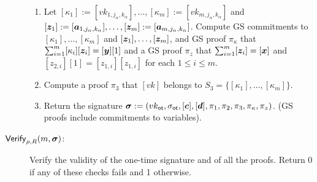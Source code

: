 \begin{description}
\begin{enumerate}
\item Let $[\kappa_1]:=[vk_{1,j_\alpha,k_\alpha}],\ldots,[\kappa_m]:=[vk_{m,j_\alpha,k_\alpha}]$ and $[{\boldsymbol{z}}_1]:=\allowbreak[{\boldsymbol{a}}_{1,j_\alpha,k_\alpha}],\allowbreak\ldots,[{\boldsymbol{z}}_m]:=[{\boldsymbol{a}}_{m,j_\alpha,k_\alpha}]$. Compute GS commitments to $[\kappa_1],\ldots,[\kappa_m]$ and $[{\boldsymbol{z}}_1],\ldots,[{\boldsymbol{z}}_m]$, and GS proof $\pi_\kappa$ that $\sum_{i=1}^{m}[\kappa_i][{\boldsymbol{z}}_i]=[{\boldsymbol{y}}][1]$ and a GS proof $\pi_{z}$ that $\sum_{i=1}^{m}[{\boldsymbol{z}}_i]=[{\boldsymbol{x}}]$ and $[z_{2,i}][1]=[z_{1,i}][z_{1,i}]$ for each $1\leq i\leq m$.
\item Compute a proof $\pi_3$ that $[vk]$ belongs to $S_3=\{[\kappa_1],\ldots,[\kappa_m]\}$.
\item Return the signature ${\boldsymbol \sigma}:=(vk_\mathsf{ot},\sigma_\mathsf{ot},[{\boldsymbol{c}}],[{\boldsymbol{d}}],\pi_1,\pi_2,\pi_3,\pi_\kappa,\pi_z)$. (GS proofs include commitments to variables).
\end{enumerate}
\item[$\mathsf{Verify}_{\rho,R}(m,{\boldsymbol \sigma})$:] Verify the validity of the one-time signature and of all the proofs. Return 0 if any of these checks fails and 1 otherwise.
\end{description}


